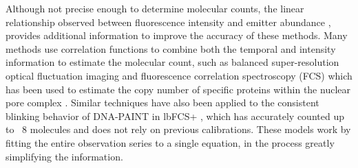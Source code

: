 Although not precise enough to determine molecular counts, the linear
relationship observed between fluorescence intensity and emitter abundance
\cite{schmied_fluorescence_2012}, provides additional information to improve the
accuracy of these methods.
%
  Many methods use correlation functions to combine both the temporal and
  intensity information to estimate the molecular count, such as balanced
  super-resolution optical fluctuation imaging and fluorescence
  correlation spectroscopy (FCS) which has been used to estimate the copy
  number of specific proteins within the nuclear pore complex
  \cite{otsuka_quantitative_2023}. Similar techniques have also been applied to the
  consistent blinking behavior of DNA-PAINT in lbFCS+ \cite{stein_calibration-free_2021}, which has
  accurately counted up to ~8 molecules and does not rely on previous
  calibrations. These models work by fitting the entire observation series to a
  single equation, in the process greatly simplifying the information. 
